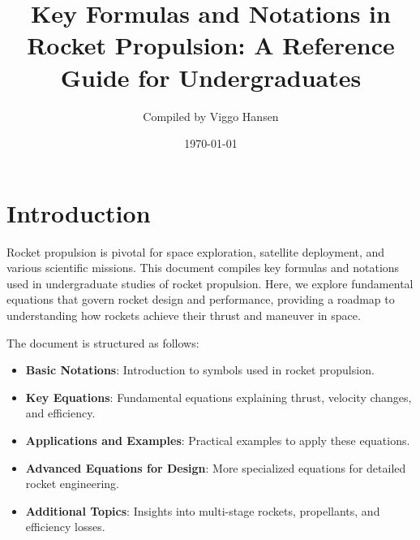 \documentclass[12pt]{report}
\title{Key Formulas and Notations in Rocket Propulsion: A Reference Guide for Undergraduates}
\author{Compiled by Viggo Hansen}
\date{\today}
\begin{document}
\maketitle

\section{Introduction}
Rocket propulsion is pivotal for space exploration, satellite deployment, and various scientific missions. This document compiles key formulas and notations used in undergraduate studies of rocket propulsion. Here, we explore fundamental equations that govern rocket design and performance, providing a roadmap to understanding how rockets achieve their thrust and maneuver in space. 

The document is structured as follows:
\begin{itemize}
    \item \textbf{Basic Notations}: Introduction to symbols used in rocket propulsion.
    \item \textbf{Key Equations}: Fundamental equations explaining thrust, velocity changes, and efficiency.
    \item \textbf{Applications and Examples}: Practical examples to apply these equations.
    \item \textbf{Advanced Equations for Design}: More specialized equations for detailed rocket engineering.
    \item \textbf{Additional Topics}: Insights into multi-stage rockets, propellants, and efficiency losses.
\end{itemize}
\end{document}
